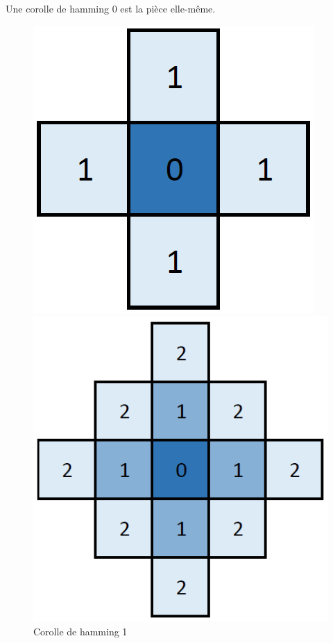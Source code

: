 	\begin{rem}
		Une corolle de hamming 0 est la pièce elle-même.
	\end{rem}
		
	\begin{figure}[H]
		\begin{minipage}[t]{0.33\textwidth}
			\includegraphics[width=\linewidth]{images/corolle_hamming_1.png}
			\caption{Corolle de hamming 1}\label{fig:corolle_hamming_1}
		\end{minipage}\hfill
		\begin{minipage}[t]{0.33\textwidth}
			\includegraphics[width=\linewidth]{images/corolle_hamming_2.png}

\end{minipage}
\end{figure}
